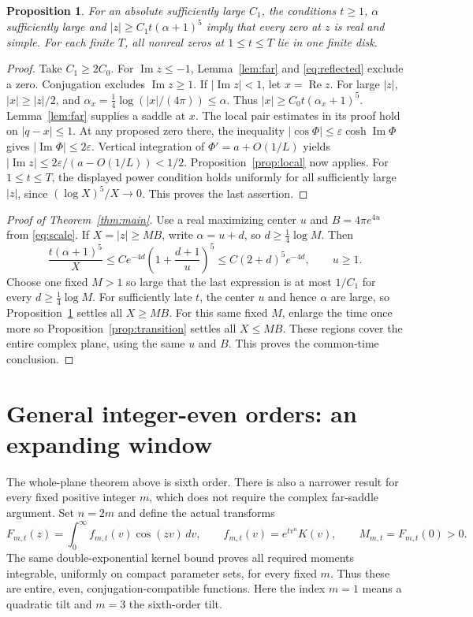\documentclass[11pt]{article}
\newtheorem{proposition}[theorem]{Proposition}
\begin{document}
\begin{proposition}\label{prop:farzeros}
For an absolute sufficiently large $C_1$, the conditions
$t\geq1$, $\alpha$ sufficiently large and
$|z|\geq C_1t(\alpha+1)^5$ imply that every zero at $z$
is real and simple. For each finite $T$, all nonreal zeros
at $1\leq t\leq T$ lie in one finite disk.
\end{proposition}
\begin{proof}
Take $C_1\geq2C_0$. For $\operatorname{Im}z\leq-1$,
Lemma~\ref{lem:far} and \eqref{eq:reflected} exclude a
zero. Conjugation excludes $\operatorname{Im}z\geq1$.
If $|\operatorname{Im}z|<1$, let $x=\operatorname{Re}z$.
For large $|z|$, $|x|\geq|z|/2$, and
$\alpha_x=\tfrac14\log(|x|/(4\pi))\leq\alpha$.
Thus $|x|\geq C_0t(\alpha_x+1)^5$. Lemma~\ref{lem:far}
supplies a saddle at $x$. The local pair estimates in its
proof hold on $|q-x|\leq1$. At any proposed zero there,
the inequality $|\cos\Phi|\leq\varepsilon\cosh\operatorname{Im}\Phi$
gives $|\operatorname{Im}\Phi|\leq2\varepsilon$.
Vertical integration of $\Phi'=a+O(1/L)$ yields
$|\operatorname{Im}z|\leq2\varepsilon/(a-O(1/L))<1/2$.
Proposition~\ref{prop:local} now applies.
For $1\leq t\leq T$, the displayed power condition holds
uniformly for all sufficiently large $|z|$, since
$(\log X)^5/X\to0$. This proves the last assertion.
\end{proof}

\begin{proof}[Proof of Theorem~\ref{thm:main}]
Use a real maximizing center $u$ and $B=4\pi e^{4u}$ from
\eqref{eq:scale}. If $X=|z|\geq MB$, write
$\alpha=u+d$, so $d\geq\tfrac14\log M$. Then
\[
 \frac{t(\alpha+1)^5}{X}
 \leq C e^{-4d}\left(1+\frac{d+1}{u}\right)^5
 \leq C(2+d)^5e^{-4d},\qquad u\geq1.
\]
Choose one fixed $M>1$ so large that the last expression
is at most $1/C_1$ for every $d\geq\tfrac14\log M$.
For sufficiently late $t$, the center $u$ and hence
$\alpha$ are large, so Proposition~\ref{prop:farzeros}
settles all $X\geq MB$. For this same fixed $M$, enlarge
the time once more so Proposition~\ref{prop:transition}
settles all $X\leq MB$. These regions cover the entire
complex plane, using the same $u$ and $B$. This proves
the common-time conclusion.
\end{proof}


\section{General integer-even orders: an expanding window}\label{sec:evenwindows}
The whole-plane theorem above is sixth order. There is also a narrower
result for every fixed positive integer $m$, which does not require the
complex far-saddle argument. Set $n=2m$ and define the actual transforms
\[
 F_{m,t}(z)=\int_0^\infty f_{m,t}(v)\cos(zv)\,dv,
 \qquad f_{m,t}(v)=e^{tv^n}K(v),\qquad M_{m,t}=F_{m,t}(0)>0.
\]
The same double-exponential kernel bound proves all required moments
integrable, uniformly on compact parameter sets, for every fixed $m$.
Thus these are entire, even, conjugation-compatible functions. Here
the index $m=1$ means a quadratic tilt and $m=3$ the sixth-order tilt.
\end{document}
